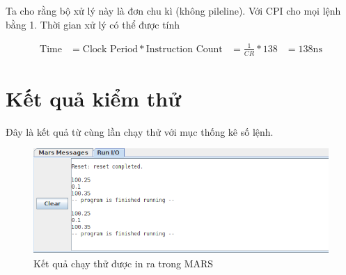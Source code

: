 Ta cho rằng bộ xử lý này là đơn chu kì (không pileline). Với CPI cho mọi
lệnh bằng 1. Thời gian xử lý có thể được tính

\begin{align*}
\text{Time} &= \text{Clock Period} * \text{Instruction Count}
            &= \frac{1}{CR} * 138
            &= 138 \text{ns}
\end{align*}

\hypertarget{kux1ebft-quux1ea3-kiux1ec3m-thux1eed}{%
\section{Kết quả kiểm thử}\label{kux1ebft-quux1ea3-kiux1ec3m-thux1eed}}

Đây là kết quả từ cùng lần chạy thử với mục thống kê số lệnh.

\begin{figure}
\centering
\includegraphics{img/test_result.png}
\caption{Kết quả chạy thử được in ra trong MARS}
\end{figure}
